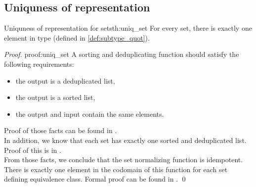 \subsection{Uniquness of representation}
\begin{theo}{Uniquness of representation for sets}{th:uniq_set}
For every set, there is exactly one element in  type (defined in \ref{def:subtype_quot}). 
\end{theo}
\begin{proof}{}{proof:uniq_set}
A sorting and deduplicating function should satisfy the following requirements:
\begin{itemize}
    \itemsep 0em 
    \item the output is a deduplicated list,
    \item the output is a sorted list,
    \item the output and input contain the same elements.
\end{itemize}
Proof of those facts can be found in .\\
In addition, we know that each set has exactly one sorted and deduplicated list. Proof of this is in  .\\
From those facts, we conclude that the set normalizing function is idempotent. There is exactly one element in the codomain of this function for each set defining equivalence class. Formal proof can be found in . \qed
\end{proof}